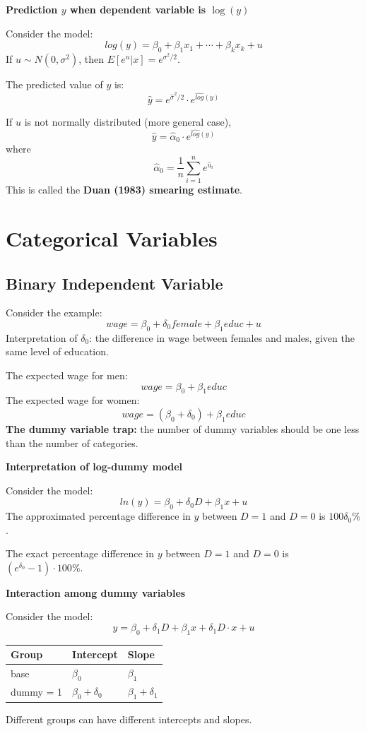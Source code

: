 \documentclass[11pt,a4paper]{article}
\begin{document}
\textbf{Prediction $y$ when dependent variable is $\log(y)$} \par
Consider the model:
\[
log(y) = \beta_0 + \beta_1 x_1 + \cdots + \beta_k x_k + u
\]
If $u \sim N(0, \sigma^2)$, then $E[e^u|x] = e^{\sigma^2 / 2}$. \par
The predicted value of $y$ is:
\[
\hat{y} = e^{\hat{\sigma}^2 / 2} \cdot e^{\widehat{log}(y)}
\]

If $u$ is not normally distributed (more general case),
\[
\hat{y} = \hat{\alpha}_0 \cdot e^{\widehat{log}(y)}
\] 
where 
\[
\hat{\alpha}_0 = \frac{1}{n} \sum_{i=1}^n e^{\hat{u}_i}
\]
This is called the \textbf{Duan (1983) smearing estimate}.

\section{Categorical Variables}
\subsection{Binary Independent Variable}
Consider the example:
\[
wage = \beta_0 + \delta_0 female + \beta_1 educ + u
\]
Interpretation of $\delta_0$: the difference in wage between females and males, given the same level of education. \par
The expected wage for men: 
\[
wage = \beta_0 + \beta_1 educ
\]
The expected wage for women:
\[
wage = (\beta_0 + \delta_0) + \beta_1 educ
\]
\textbf{The dummy variable trap:} the number of dummy variables should be one less than the number of categories. \par

\textbf{Interpretation of log-dummy model} \par
Consider the model:
\[
ln(y) = \beta_0 + \delta_0 D + \beta_1 x + u
\]
The approximated percentage difference in $y$ between $D=1$ and $D=0$ is $100 \delta_0 \%$. \par
The exact percentage difference in $y$ between $D=1$ and $D=0$ is $(e^{\delta_0} - 1) \cdot 100 \%$.

\textbf{Interaction among dummy variables} \par
Consider the model:
\[
y = \beta_0 + \delta_1 D + \beta_1 x + \delta_1 D \cdot x + u
\]

\begin{center}
\begin{tabular}{lll}
    \hline
    Group & Intercept & Slope \\
    \hline
    base & $\beta_0$ & $\beta_1$ \\
    dummy = 1 & $\beta_0 + \delta_0$ & $\beta_1 + \delta_1$ \\
    \hline
\end{tabular}
\end{center}
Different groups can have different intercepts and slopes.
\end{document}
